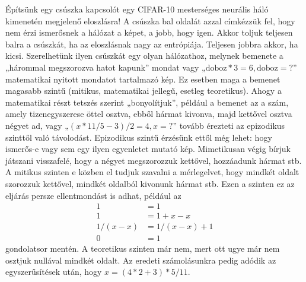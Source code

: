 \documentclass[a4paper]{article}
\begin{document}
Építsünk egy csúszka kapcsolót egy CIFAR-10 mesterséges neurális háló kimenetén megjelenő eloszlásra! A csúszka bal oldalát azzal címkézzük fel, hogy nem érzi ismerősnek a hálózat a képet, a jobb, hogy igen. Akkor toljuk teljesen balra a csúszkát, ha az eloszlásnak nagy az entrópiája. Teljesen jobbra akkor, ha kicsi. Szerelhetünk ilyen csúszkát egy olyan hálózathoz, melynek bemenete a „hárommal megszorozva hatot kapunk” mondat vagy „$\text{doboz}*3=6, \text{doboz}=\text{?}$” matematikai nyitott mondatot tartalmazó kép. Ez esetben maga a bemenet magasabb szintű (mitikus, matematikai jellegű, esetleg teoretikus). Ahogy a matematikai részt tetszés szerint „bonyolítjuk”, például a bemenet az a szám, amely tizenegyszerese öttel osztva, ebből hármat kivonva, majd kettővel osztva négyet ad, vagy „$(x*11/5-3)/2=4, x=\text{?}$” tovább érezteti az epizodikus szinttől való távolodást. Epizodikus szintű érzésünk ettől még lehet: hogy ismerős-e vagy sem egy ilyen egyenletet mutató kép. Mimetikusan végig bírjuk játszani visszafelé, hogy a négyet megszorozzuk kettővel, hozzáadunk hármat stb. A mitikus szinten e közben el tudjuk szavalni a mérlegelvet, hogy mindkét oldalt szorozzuk kettővel, mindkét oldalból kivonunk hármat stb. Ezen a szinten ez az eljárás persze ellentmondást is adhat, például az
\begin{align*}
1&=1 \\
1&=1+x-x \\
1/(x-x)&=1/(x-x) +1\\
0&=1
\end{align*}
gondolatsor mentén. A teoretikus szinten már nem, mert ott ugye már nem osztjuk nullával mindkét oldalt. Az eredeti számolásunkra pedig adódik az egyszerűsítések után, hogy $x=(4*2+3)*5/11$.
\end{document}
